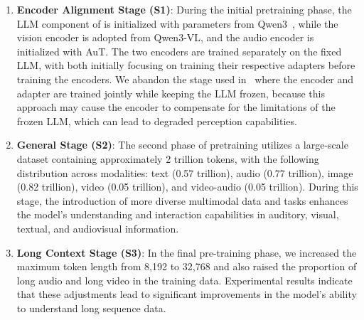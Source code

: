 \begin{enumerate}[label=(\arabic*)]
    \item \textbf{Encoder Alignment Stage (S1)}: During the initial pretraining phase, the LLM component of \method is initialized with parameters from Qwen3~\citep{qwen3}, while the vision encoder is adopted from Qwen3-VL, and the audio encoder is initialized with AuT. The two encoders are trained separately on the fixed LLM, with both initially focusing on training their respective adapters before training the encoders. We abandon the stage used in~\cite{qwen2.5vl, qwen2.5omni} where the encoder and adapter are trained jointly while keeping the LLM frozen, because this approach may cause the encoder to compensate for the limitations of the frozen LLM, which can lead to degraded perception capabilities.
    \item \textbf{General Stage (S2)}: The second phase of pretraining utilizes a large-scale dataset containing approximately 2 trillion tokens, with the following distribution across modalities: text (0.57 trillion), audio (0.77 trillion), image (0.82 trillion), video (0.05 trillion), and video-audio (0.05 trillion). During this stage, the introduction of more diverse multimodal data and tasks enhances the model’s understanding and interaction capabilities in auditory, visual, textual, and audiovisual information.
    \item \textbf{Long Context Stage (S3)}: In the final pre-training phase, we increased the maximum token length from 8,192 to 32,768 and also raised the proportion of long audio and long video in the training data. Experimental results indicate that these adjustments lead to significant improvements in the model's ability to understand long sequence data.
\end{enumerate}










